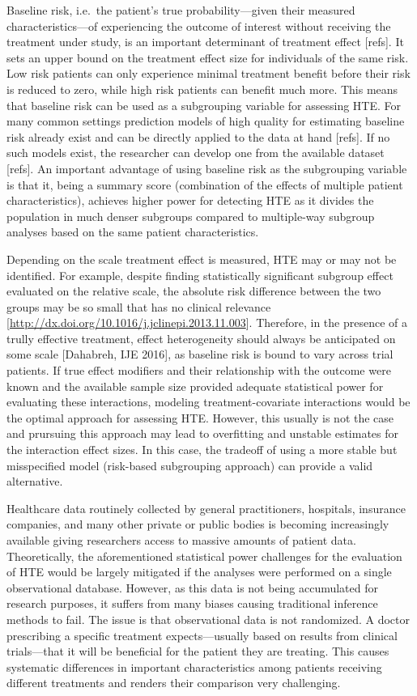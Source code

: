 \documentclass[
]{book}
\begin{document}
Baseline risk, i.e.~the patient's true probability---given their measured
characteristics---of experiencing the outcome of interest without receiving the
treatment under study, is an important determinant of treatment effect
{[}refs{]}. It sets an upper bound on the treatment effect size for individuals of
the same risk. Low risk patients can only experience minimal treatment benefit
before their risk is reduced to zero, while high risk patients can benefit much
more. This means that baseline risk can be used as a subgrouping variable for
assessing HTE. For many common settings prediction models of high quality for
estimating baseline risk already exist and can be directly applied to the data
at hand {[}refs{]}. If no such models exist, the researcher can develop one from the
available dataset {[}refs{]}. An important advantage of using baseline risk as the
subgrouping variable is that it, being a summary score (combination of the
effects of multiple patient characteristics), achieves higher power for
detecting HTE as it divides the population in much denser subgroups compared to
multiple-way subgroup analyses based on the same patient characteristics.

Depending on the scale treatment effect is measured, HTE may or may not be
identified. For example, despite finding statistically significant subgroup effect
evaluated on the relative scale, the absolute risk difference between the two
groups may be so small that has no clinical relevance
{[}\url{http://dx.doi.org/10.1016/j.jclinepi.2013.11.003}{]}. Therefore, in the presence
of a trully effective treatment, effect heterogeneity should always be
anticipated on some scale {[}Dahabreh, IJE 2016{]}, as baseline risk is bound to
vary across trial patients. If true effect modifiers and their relationship with
the outcome were known and the available sample size provided adequate
statistical power for evaluating these interactions, modeling
treatment-covariate interactions would be the optimal approach for assessing
HTE. However, this usually is not the case and prursuing this approach may lead
to overfitting and unstable estimates for the interaction effect sizes. In this
case, the tradeoff of using a more stable but misspecified model (risk-based
subgrouping approach) can provide a valid alternative.

Healthcare data routinely collected by general practitioners, hospitals,
insurance companies, and many other private or public bodies is becoming
increasingly available giving researchers access to massive amounts of patient
data. Theoretically, the aforementioned statistical power challenges for the
evaluation of HTE would be largely mitigated if the analyses were performed on a
single observational database. However, as this data is not being accumulated
for research purposes, it suffers from many biases causing traditional inference
methods to fail. The issue is that observational data is not randomized. A
doctor prescribing a specific treatment expects---usually based on results from
clinical trials---that it will be beneficial for the patient they are
treating. This causes systematic differences in important characteristics among
patients receiving different treatments and renders their comparison very
challenging.
\end{document}

